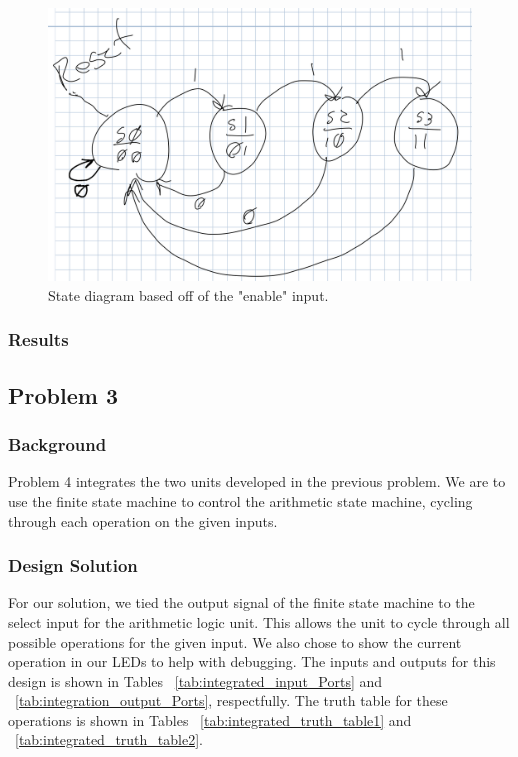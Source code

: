 \documentclass[11pt]{article}
\begin{document}
\begin{center}
\begin{figure}[H]
	\includegraphics[width=\textwidth]{./images/fsmStateDiagram.png}
	\caption{\label{fig:fsm_state_diagram}State diagram based off of the "enable" input.}
\end{figure}
\end{center}

\subsubsection{Results}



\subsection{Problem 3}

\subsubsection{Background}
Problem 4 integrates the two units developed in the previous problem. We are to use the finite state machine to control the arithmetic state machine, cycling through each operation on the given inputs.

\subsubsection{Design Solution}
For our solution, we tied the output signal of the finite state machine to the select input for the arithmetic logic unit. This allows the unit to cycle through all possible operations for the given input. We also chose to show the current operation in our LEDs to help with debugging. The inputs and outputs for this design is shown in Tables ~\ref{tab:integrated_input_Ports} and ~\ref{tab:integration_output_Ports}, respectfully. The truth table for these operations is shown in Tables ~\ref{tab:integrated_truth_table1} and ~\ref{tab:integrated_truth_table2}.
\end{document}
